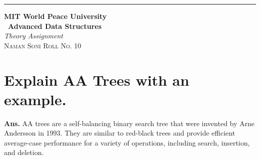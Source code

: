 \documentclass{article}
\begin{document}
\begin{titlepage} %

	\raggedleft\rule{1pt}{\textheight} %
	\hspace{0.05\textwidth} %
	\parbox[b]{0.75\textwidth}
    { %
		
		{\Huge\bfseries MIT World Peace University \\[0.5\baselineskip] \ Advanced Data Structures}\\[2\baselineskip] %
		{\large\textit{Theory Assignment}}\\[4\baselineskip] %
		{\Large\textsc{Naman Soni Roll No. 10}} %
		
		\vspace{0.5\textheight} %
	}

\end{titlepage}
\tableofcontents
\pagebreak
\section{\textbf{Explain AA Trees with an example.}}
\textbf{Ans.} AA trees are a self-balancing binary search tree that were invented by Arne Andersson in 1993. They are similar to red-black trees and provide efficient average-case performance for a variety of operations, including search, insertion, and deletion.\\
\end{document}
